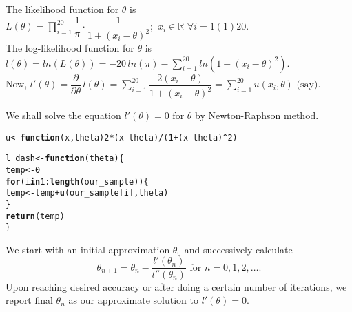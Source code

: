 \documentclass[11pt, a4paper]{article}\usepackage[]{graphicx}\usepackage[]{xcolor}
\makeatletter
\newcommand{\hlnum}[1]{\textcolor[rgb]{0.686,0.059,0.569}{#1}}%
\newcommand{\hlopt}[1]{\textcolor[rgb]{0,0,0}{#1}}%
\newcommand{\hldef}[1]{\textcolor[rgb]{0.345,0.345,0.345}{#1}}%
\newcommand{\hlkwa}[1]{\textcolor[rgb]{0.161,0.373,0.58}{\textbf{#1}}}%
\newcommand{\hlkwb}[1]{\textcolor[rgb]{0.69,0.353,0.396}{#1}}%
\newcommand{\hlkwc}[1]{\textcolor[rgb]{0.333,0.667,0.333}{#1}}%
\newcommand{\hlkwd}[1]{\textcolor[rgb]{0.737,0.353,0.396}{\textbf{#1}}}%
\newenvironment{kframe}{%
 \def\at@end@of@kframe{}%
 \ifinner\ifhmode%
  \def\at@end@of@kframe{\end{minipage}}%
  \begin{minipage}{\columnwidth}%
 \fi\fi%
 \def\FrameCommand##1{\hskip\@totalleftmargin \hskip-\fboxsep
 \colorbox{shadecolor}{##1}\hskip-\fboxsep
     \hskip-\linewidth \hskip-\@totalleftmargin \hskip\columnwidth}%
 \MakeFramed {\advance\hsize-\width
   \@totalleftmargin\z@ \linewidth\hsize
   \@setminipage}}%
 {\par\unskip\endMakeFramed%
 \at@end@of@kframe}
\newenvironment{knitrout}{}{} %
\makeatother
\begin{document}
The likelihood function for $\theta$ is $L(\theta) = \prod \limits_{i = 1}^{20} \dfrac{1}{\pi} \cdot \dfrac{1}{1 + (x_i - \theta)^2}; \,\, x_i \in \mathbb{R} \,\, \forall i = 1(1)20$. \\

The log-likelihood function for $\theta$ is $l(\theta) = ln (L(\theta)) = -20 \, ln (\pi) - \sum \limits_{i = 1}^{20} ln (1 + (x_i - \theta)^2)$. \\

Now, $l'(\theta) = \dfrac{\partial}{\partial \theta} \, l(\theta) = \sum \limits_{i = 1}^{20} \dfrac{2(x_i - \theta)}{1 + (x_i - \theta)^2} = \sum \limits_{i = 1}^{20} u(x_i, \theta) \,\, \text{(say)}$. \\

\vspace{0.2cm}

We shall solve the equation $l'(\theta) = 0$ for $\theta$ by Newton-Raphson method. 
\begin{knitrout}
\color{fgcolor}\begin{kframe}
\begin{alltt}
\hldef{u} \hlkwb{<-} \hlkwa{function}\hldef{(}\hlkwc{x}\hldef{,} \hlkwc{theta}\hldef{)} \hlnum{2}\hlopt{*}\hldef{(x} \hlopt{-} \hldef{theta)}\hlopt{/}\hldef{(}\hlnum{1} \hlopt{+} \hldef{(x} \hlopt{-} \hldef{theta)}\hlopt{^}\hlnum{2}\hldef{)}
\end{alltt}
\end{kframe}
\end{knitrout}

\begin{knitrout}
\color{fgcolor}\begin{kframe}
\begin{alltt}
\hldef{l_dash} \hlkwb{<-} \hlkwa{function}\hldef{(}\hlkwc{theta}\hldef{)\{}
  \hldef{temp} \hlkwb{<-} \hlnum{0}
  \hlkwa{for} \hldef{(i} \hlkwa{in} \hlnum{1}\hlopt{:}\hlkwd{length}\hldef{(our_sample)) \{}
    \hldef{temp} \hlkwb{<-} \hldef{temp} \hlopt{+} \hlkwd{u}\hldef{(our_sample[i], theta)}
  \hldef{\}}
  \hlkwd{return}\hldef{(temp)}
\hldef{\}}
\end{alltt}
\end{kframe}
\end{knitrout}

We start with an initial approximation $\theta_0$ and successively calculate $$\theta_{n+1} = \theta_n - \dfrac{l'(\theta_n)}{l''(\theta_n)} \,\, \text{for} \,\, n = 0, 1, 2, \ldots.$$ Upon reaching desired accuracy or after doing a certain number of iterations, we report final $\theta_n$ as our approximate solution to $l'(\theta) = 0$. \\
\end{document}
